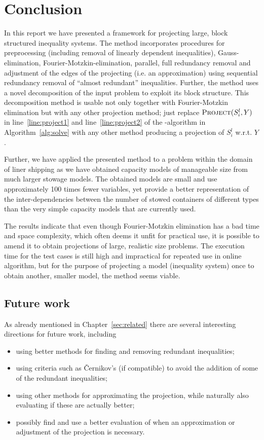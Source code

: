 \section{Conclusion}\label{sec:conclusion}
In this report we have presented a framework for projecting large, block structured inequality systems. The method incorporates procedures for preprocessing (including removal of linearly dependent inequalities), Gauss-elimination, Fourier-Motzkin-elimination, parallel, full redundancy removal and {adjustment} of the edges of the projecting (i.e. an approximation) using sequential redundancy removal of ``almost redundant'' inequalities. Further, the method uses a {novel} decomposition of the input problem to exploit its block structure. 
This decomposition method is usable not only together with Fourier-Motzkin elimination but with any other projection method; just replace $\Call{Project}{S^l_i,Y}$ in line~\ref{line:project1} and line~\ref{line:project2} of the -algorithm in Algorithm~\ref{alg:solve} with any other method producing a projection of $S^l_i$ w.r.t. $Y$.

Further, we have applied the presented method to a problem within the domain of liner shipping as we have obtained capacity models of manageable size from much larger stowage models. The obtained models are small and use approximately 100 times fewer variables, yet provide a better representation of the inter-dependencies between the number of stowed containers of different types than the very simple capacity models that are currently used. 

The results indicate that even though Fourier-Motzkin elimination has a bad time and space complexity, which often deems it unfit for practical use, it is possible to amend it to obtain projections of large, realistic size problems. 
The execution time for the test cases is still high and impractical for repeated use in online algorithm, but for the purpose of projecting a model (inequality system) once to obtain another, smaller model, the method {seems} viable.

\subsection{Future work}
As already mentioned in Chapter~\ref{sec:related} there are several interesting directions for future work, including
\begin{itemize}
\item using better methods for finding and removing redundant inequalities; 
\item using criteria such as \v{C}ernikov's (if compatible) to avoid the addition of some of the redundant inequalities;
\item using other methods for approximating the projection, while naturally also evaluating if these are actually better;
\item possibly find and use a better evaluation of when an approximation or adjustment of the projection is necessary.
\end{itemize}

